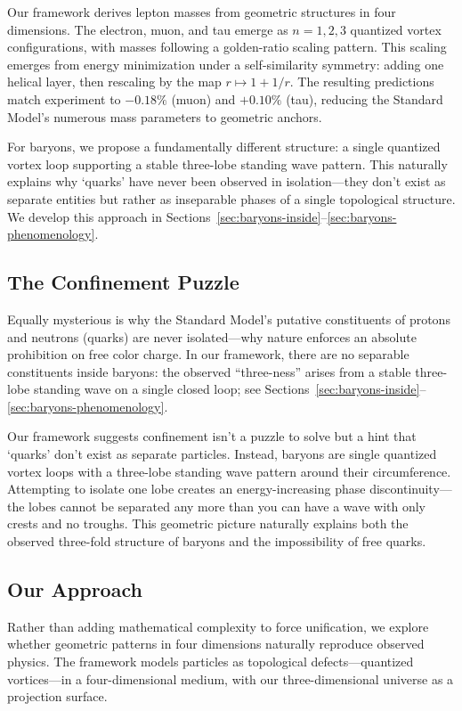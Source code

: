 Our framework derives lepton masses from geometric structures in four dimensions. The electron, muon, and tau emerge as $n=1,2,3$ quantized vortex configurations, with masses following a golden-ratio scaling pattern. This scaling emerges from energy minimization under a self-similarity symmetry: adding one helical layer, then rescaling by the map $r\mapsto 1+1/r$. The resulting predictions match experiment to $-0.18\%$ (muon) and $+0.10\%$ (tau), reducing the Standard Model's numerous mass parameters to geometric anchors.

For baryons, we propose a fundamentally different structure: a single quantized vortex loop supporting a stable three-lobe standing wave pattern. This naturally explains why `quarks' have never been observed in isolation---they don't exist as separate entities but rather as inseparable phases of a single topological structure. We develop this approach in Sections~\ref{sec:baryons-inside}--\ref{sec:baryons-phenomenology}.

\subsection{The Confinement Puzzle}

Equally mysterious is why the Standard Model's putative constituents of protons and neutrons (quarks) are never isolated---why nature enforces an absolute prohibition on free color charge. In our framework, there are no separable constituents inside baryons: the observed ``three-ness'' arises from a stable three-lobe standing wave on a single closed loop; see Sections~\ref{sec:baryons-inside}--\ref{sec:baryons-phenomenology}.

Our framework suggests confinement isn't a puzzle to solve but a hint that `quarks' don't exist as separate particles. Instead, baryons are single quantized vortex loops with a three-lobe standing wave pattern around their circumference. Attempting to isolate one lobe creates an energy-increasing phase discontinuity---the lobes cannot be separated any more than you can have a wave with only crests and no troughs. This geometric picture naturally explains both the observed three-fold structure of baryons and the impossibility of free quarks.

\subsection{Our Approach}

Rather than adding mathematical complexity to force unification, we explore whether geometric patterns in four dimensions naturally reproduce observed physics. The framework models particles as topological defects---quantized vortices---in a four-dimensional medium, with our three-dimensional universe as a projection surface.

